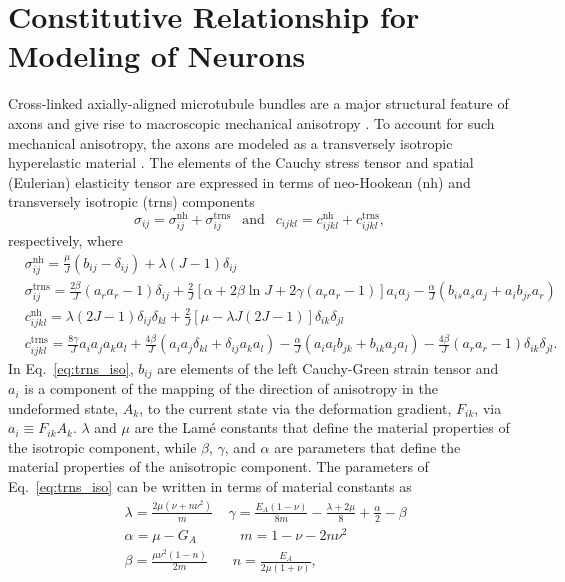 \documentclass[]{interact}
\begin{document}
\section{Constitutive Relationship for Modeling of Neurons}
Cross-linked axially-aligned microtubule bundles are a major structural feature of axons and give rise to macroscopic mechanical anisotropy \citep{Peter:2012fc}. To account for such mechanical anisotropy, the axons are modeled as a transversely isotropic hyperelastic material \citep{JavierBonet:2008uxa,Bonet:1998vc}. The elements of the Cauchy stress tensor and spatial (Eulerian) elasticity tensor are expressed in terms of neo-Hookean (nh) and transversely isotropic (trns) components \citep{Bonet:1998vc}
%
\begin{equation}
\sigma_{ij} = \sigma^{\text{nh}}_{ij} + \sigma^{\text{trns}}_{ij} \ \ \text{ and } \ \ c_{ijkl} = c^{\text{nh}}_{ijkl} + c^{\text{trns}}_{ijkl},
\end{equation}
%
respectively, where 
%
\begin{align}
&\sigma^{\text{nh}}_{ij} = \frac{\mu}{J}(b_{ij} - \delta_{ij}) + \lambda(J-1)\delta_{ij} \nonumber\\
%
&\sigma^{\text{trns}}_{ij} = \frac{2\beta}{J}(a_r a_r - 1)\delta_{ij} + \frac{2}{J}[\alpha+2\beta\ln J+2\gamma(a_r a_r -1)]a_i a_j - \frac{\alpha}{J}(b_{is}a_s a_j+a_i b_{jr}a_r) \nonumber\\
%
&c^{\text{nh}}_{ijkl} = \lambda(2J-1)\delta_{ij}\delta_{kl} + \frac{2}{J}[\mu - \lambda J(2J-1)]\delta_{ik}\delta_{jl} \nonumber\\
%
&c^{\text{trns}}_{ijkl} = \frac{8\gamma}{J}a_i a_j a_k a_l + \frac{4\beta}{J}(a_i a_j \delta_{kl} + \delta_{ij}a_k a_l) - \frac{\alpha}{J}(a_i a_l b_{jk} + b_{ik}a_j a_l) - \frac{4\beta}{J}(a_r a_r - 1)\delta_{ik}\delta_{jl}.
\label{eq:trns_iso}
\end{align}
%
In Eq.\ \eqref{eq:trns_iso}, $b_{ij}$ are elements of the left Cauchy-Green strain tensor and $a_i$ is a component of the mapping of the direction of anisotropy in the undeformed state, $A_k$, to the current state via the deformation gradient, $F_{ik}$, via $a_i \equiv F_{ik}A_k$. $\lambda$ and $\mu$ are the Lam\'e constants that define the material properties of the isotropic component, while $\beta$, $\gamma$, and $\alpha$ are parameters that define the material properties of the anisotropic component. The parameters of Eq.\ \eqref{eq:trns_iso} can be written in terms of material constants as
%
\begin{align}
&\lambda = \frac{2\mu (\nu+n\nu^2)}{m} \ \ \ \ \ \gamma = \frac{E_A(1-\nu)}{8m} - \frac{\lambda+2\mu}{8} + \frac{\alpha}{2} - \beta \nonumber\\
%
&\alpha = \mu - G_A \ \ \ \ \ \ \ \ \ \ \ \ \ \ m = 1 - \nu - 2 n\nu^2 \nonumber\\
%
&\beta = \frac{\mu \nu^2(1-n)}{2m} \ \ \ \ \ \ \ \ n = \frac{E_A}{2\mu(1+\nu)},
\label{eq:trns_iso_constants}
\end{align}
\end{document}
